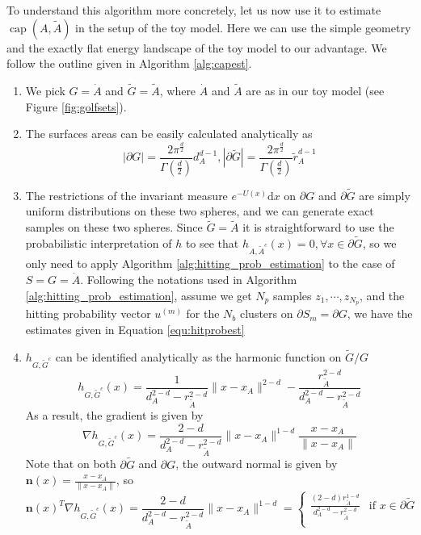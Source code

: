 \documentclass[english, aip, jcp, priprint, graphicx]{revtex4-1}
\theoremstyle{plain}
\theoremstyle{definition}
\theoremstyle{plain}
\begin{document}
To understand this algorithm more concretely, let us now use it to estimate $\ensuremath{\operatorname{cap}} (A, \tilde{A})$ in the setup of the toy model. Here we can use the simple geometry and the exactly flat energy landscape of the toy model to our advantage. We follow the outline given in Algorithm \ref{alg:capest}.

\begin{enumerate}
	\item We pick $G = \dot{A}$ and $\tilde{G} = \tilde{A}$, where $\dot{A}$ and $\tilde{A}$ are as in our toy model (see Figure \ref{fig:golfsets}).
	\item The surfaces areas can be easily calculated analytically as
\[|\partial G| = \frac{2\pi^{\frac{d}{2}}}{\Gamma(\frac{d}{2})}d_A^{d - 1}, |\partial \tilde{G}| = \frac{2\pi^{\frac{d}{2}}}{\Gamma(\frac{d}{2})}\tilde{r}_A^{d - 1}\]
	\item The restrictions of the invariant measure $e^{- U (x)} \mathrm{d} x$ on $\partial G$ and $\partial \tilde{G}$ are simply uniform distributions on these two spheres, and we can generate exact samples on these two spheres. Since $\tilde{G} = \tilde{A}$ it is straightforward to use the probabilistic interpretation of $h$ to see that $h_{A, \tilde{A}^c} (x) = 0, \forall x \in \partial \tilde{G}$, so we only need to apply Algorithm \ref{alg:hitting_prob_estimation} to the case of $S=G=\dot{A}$. Following the notations used in Algorithm \ref{alg:hitting_prob_estimation}, assume we get $N_p$ samples $z_1,\cdots, z_{N_p}$, and the hitting probability vector $u^{(m)}$ for the $N_b$ clusters on $\partial S_m = \partial G$, we have the estimates given in Equation \ref{equ:hitprobest}
	\item $h_{G, \tilde{G}^c}$ can be identified analytically as the harmonic function on $\tilde{G} / G$\cite{Wendel1980-sj}
\[ h_{G, \tilde{G}^c} (x) = \frac{1}{d_A^{2 - d} - r_{\tilde{A}}^{2 - d}} \| x
- x_A \|^{2 - d} - \frac{r_{\tilde{A}}^{2 - d}}{d_A^{2 - d} -
r_{\tilde{A}}^{2 - d}} \]
As a result, the gradient is given by
\[ \nabla h_{G, \tilde{G}^c} (x) = \frac{2 - d}{d_A^{2 - d} - r_{\tilde{A}}^{2
   - d}} \| x - x_A \|^{1 - d} \frac{x - x_A}{\| x - x_A \|} \]
Note that on both $\partial \tilde{G}$ and $\partial G$, the outward normal is
given by ${\textbf{n}} (x) = \frac{x - x_A}{\| x - x_A \|}$, so
\[
	{\textbf{n}} (x)^T \nabla h_{G, \tilde{G}^c} (x) = \frac{2 - d}{d_A^{2 - d} - r_{\tilde{A}}^{2 - d}} \| x - x_A \|^{1 - d} = 
\begin{cases}
	\frac{(2 - d) r_{\tilde{A}}^{1 - d}}{d_A^{2 - d} - r_{\tilde{A}}^{2 - d}} & \text{if }x \in \partial \tilde{G}\\

\end{cases}\]
\end{enumerate}
\end{document}

